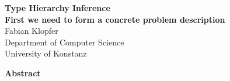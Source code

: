 \begin{titlepage}
\thispagestyle{plain}
   \begin{center}
       \vspace*{1cm}
        \Huge
       \textbf{Type Hierarchy Inference} \\
       \Large
       \textbf{First we need to form a concrete problem description}\\
       \vspace*{1cm}
       \normalsize
       Fabian Klopfer \\
       Department of Computer Science \\
       University of Konstanz \\
        \vspace*{1cm}
        
        \textbf{Abstract}
        
   \end{center}
\end{titlepage}

\newpage
\tableofcontentsH